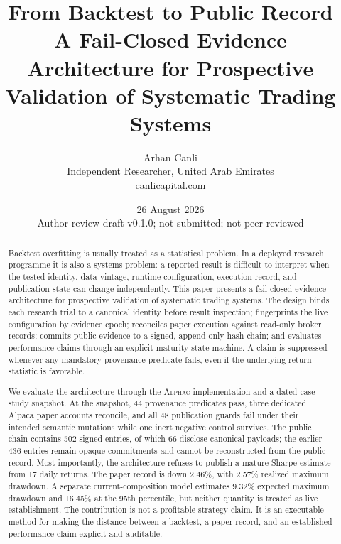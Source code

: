 \documentclass[11pt]{article}
\title{\vspace{-1.4em}\textbf{From Backtest to Public Record}\\[0.35em]
\Large A Fail-Closed Evidence Architecture for Prospective Validation of Systematic Trading Systems}
\author{Arhan Canli\\Independent Researcher, United Arab Emirates\\\href{https://canlicapital.com}{canlicapital.com}}
\date{26 August 2026\\Author-review draft v0.1.0; not submitted; not peer reviewed}
\newcommand{\system}{\textsc{Alphac}}
\begin{document}
\maketitle

\begin{center}
\end{center}

\begin{abstract}
Backtest overfitting is usually treated as a statistical problem. In a deployed research programme it is also a systems problem: a reported result is difficult to interpret when the tested identity, data vintage, runtime configuration, execution record, and publication state can change independently. This paper presents a fail-closed evidence architecture for prospective validation of systematic trading systems. The design binds each research trial to a canonical identity before result inspection; fingerprints the live configuration by evidence epoch; reconciles paper execution against read-only broker records; commits public evidence to a signed, append-only hash chain; and evaluates performance claims through an explicit maturity state machine. A claim is suppressed whenever any mandatory provenance predicate fails, even if the underlying return statistic is favorable.

We evaluate the architecture through the
\system{} implementation and a dated case-study snapshot. At the snapshot, 44 provenance predicates pass, three dedicated Alpaca paper accounts reconcile, and all 48 publication guards fail under their intended semantic mutations while one inert negative control survives. The public chain contains 502 signed entries, of which 66 disclose canonical payloads; the earlier 436 entries remain opaque commitments and cannot be reconstructed from the public record. Most importantly, the architecture refuses to publish a mature Sharpe estimate from 17 daily returns. The paper record is down 2.46\%, with 2.57\% realized maximum drawdown. A separate current-composition model estimates 9.32\% expected maximum drawdown and 16.45\% at the 95th percentile, but neither quantity is treated as live establishment. The contribution is not a profitable strategy claim. It is an executable method for making the distance between a backtest, a paper record, and an established performance claim explicit and auditable.
\end{abstract}
\end{document}
